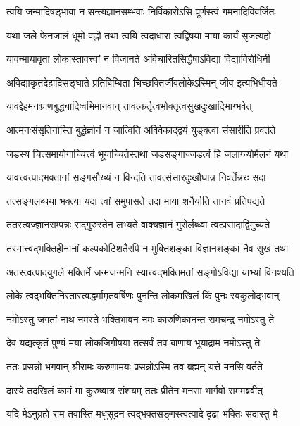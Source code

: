 \twolineshloka
{त्वयि जन्मादिषड्भावा न सन्त्यज्ञानसम्भवाः}
{निर्विकारोऽसि पूर्णस्त्वं गमनादिविवर्जितः} %

\twolineshloka
{यथा जले फेनजालं धूमो वह्नौ तथा त्वयि}
{त्वदाधारा त्वद्विषया माया कार्यं सृजत्यहो} %

\twolineshloka
{यावन्मायावृता लोकास्तावत्त्वां न विजानते}
{अविचारितसिद्धैषाऽविद्या विद्याविरोधिनी} %

\twolineshloka
{अविद्याकृतदेहादिसङ्घाते प्रतिबिम्बिता}
{चिच्छक्तिर्जीवलोकेऽस्मिन् जीव इत्यभिधीयते} %

\twolineshloka
{यावद्देहमनःप्राणबुद्ध्यादिष्वभिमानवान्}
{तावत्कर्तृत्वभोक्तृत्वसुखदुःखादिभाग्भवेत्} %

\twolineshloka
{आत्मनःसंसृतिर्नास्ति बुद्धेर्ज्ञानं न जात्विति}
{अविवेकाद्द्वयं युङ्क्त्वा संसारीति प्रवर्तते} %

\twolineshloka
{जडस्य चित्समायोगाच्चित्त्वं भूयाच्चितेस्तथा}
{जडसङ्गाज्जडत्वं हि जलाग्न्योर्मेलनं यथा} %

\twolineshloka
{यावत्त्वत्पादभक्तानां सङ्गसौख्यं न विन्दति}
{तावत्संसारदुःखौघान्न निवर्तेन्नरः सदा} %

\twolineshloka
{तत्सङ्गलब्धया भक्त्या यदा त्वां समुपासते}
{तदा माया शनैर्याति तानवं प्रतिपद्यते} %

\twolineshloka
{ततस्त्वज्ज्ञानसम्पन्नः सद्गुरुस्तेन लभ्यते}
{वाक्यज्ञानं गुरोर्लब्ध्वा त्वत्प्रसादाद्विमुच्यते} %

\twolineshloka
{तस्मात्त्वद्भक्तिहीनानां कल्पकोटिशतैरपि}
{न मुक्तिशङ्का विज्ञानशङ्का नैव सुखं तथा} %

\twolineshloka
{अतस्त्वत्पादयुगले भक्तिर्मे जन्मजन्मनि}
{स्यात्त्वद्भक्तिमतां सङ्गोऽविद्या याभ्यां विनश्यति} %

\twolineshloka
{लोके त्वद्भक्तिनिरतास्त्वद्धर्मामृतवर्षिणः}
{पुनन्ति लोकमखिलं किं पुनः स्वकुलोद्भवान्} %

\twolineshloka
{नमोऽस्तु जगतां नाथ नमस्ते भक्तिभावन}
{नमः कारुणिकानन्त रामचन्द्र नमोऽस्तु ते} %

\twolineshloka
{देव यद्यत्कृतं पुण्यं मया लोकजिगीषया}
{तत्सर्वं तव बाणाय भूयाद्राम नमोऽस्तु ते} %

\twolineshloka
{ततः प्रसन्नो भगवान् श्रीरामः करुणामयः}
{प्रसन्नोऽस्मि तव ब्रह्मन् यत्ते मनसि वर्तते} %

\twolineshloka
{दास्ये तदखिलं कामं मा कुरुष्वात्र संशयम्}
{ततः प्रीतेन मनसा भार्गवो राममब्रवीत्} %

\twolineshloka
{यदि मेऽनुग्रहो राम तवास्ति मधुसूदन}
{त्वद्भक्तसङ्गस्त्वत्पादे दृढा भक्तिः सदास्तु मे} %

